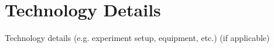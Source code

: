 \chapter{Technology Details}

Technology details (e.g. experiment setup, equipment, etc.) (if applicable)